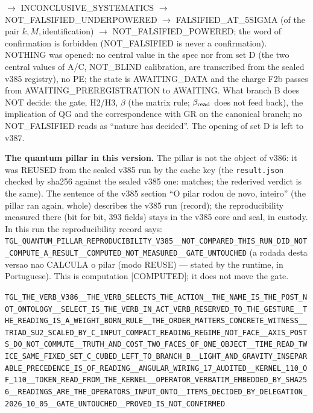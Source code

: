\documentclass[11pt]{article}
\theoremstyle{definition}\newtheorem{deriv}{Derivation}
\begin{document}
$\to$ INCONCLUSIVE\_SYSTEMATICS $\to$ NOT\_FALSIFIED\_UNDERPOWERED $\to$ FALSIFIED\_AT\_5SIGMA (of the pair $k,M,$identification) $\to$ NOT\_FALSIFIED\_POWERED; the word of confirmation is forbidden (NOT\_FALSIFIED is never a confirmation). NOTHING was opened: no central value in the spec nor from set D (the two central values of A/C, NOT\_BLIND calibration, are transcribed from the sealed v385 registry), no PE; the state is AWAITING\_DATA and the charge F2b passes from AWAITING\_PREREGISTRATION to AWAITING. What branch B does NOT decide: the gate, H2/H3, $\beta$ (the matrix rule; $\beta_{\rm read}$ does not feed back), the implication of QG and the correspondence with GR on the canonical branch; no NOT\_FALSIFIED reads as ``nature has decided''. The opening of set D is left to v387.

\textbf{The quantum pillar in this version.} The pillar is not the object of v386: it was REUSED from the sealed v385 run by the cache key (the \texttt{result.json} checked by sha256 against the sealed v385 one: matches; the rederived verdict is the same). The sentence of the v385 section ``O pilar rodou de novo, inteiro'' (the pillar ran again, whole) describes the v385 run (record); the reproducibility measured there (bit for bit, 393 fields) stays in the v385 core and seal, in custody. In this run the reproducibility record says: \texttt{TGL\_QUANTUM\_PILLAR\_REPRODUCIBILITY\_V385\_\_NOT\_COMPARED\_THIS\_RUN\_DID\_NOT\_COMPUTE\_A\_RESULT\_\_COMPUTED\_NOT\_MEASURED\_\_GATE\_UNTOUCHED} (a rodada desta versao nao CALCULA o pilar (modo REUSE) --- stated by the runtime, in Portuguese). This is computation \textsf{[COMPUTED]}; it does not move the gate.

\begin{center}\small\texttt{TGL\_THE\_VERB\_V386\_\_THE\_VERB\_SELECTS\_THE\_ACTION\_\_THE\_NAME\_IS\_THE\_POST\_NOT\_ONTOLOGY\_\_SELECT\_IS\_THE\_VERB\_IN\_ACT\_VERB\_RESERVED\_TO\_THE\_GESTURE\_\_THE\_READING\_IS\_A\_WEIGHT\_BORN\_RULE\_\_THE\_ORDER\_MATTERS\_CONCRETE\_WITNESS\_\_TRIAD\_SU2\_SCALED\_BY\_C\_INPUT\_COMPACT\_READING\_REGIME\_NOT\_FACE\_\_AXIS\_POSTS\_DO\_NOT\_COMMUTE\_\_TRUTH\_AND\_COST\_TWO\_FACES\_OF\_ONE\_OBJECT\_\_TIME\_READ\_TWICE\_SAME\_FIXED\_SET\_C\_CUBED\_LEFT\_TO\_BRANCH\_B\_\_LIGHT\_AND\_GRAVITY\_INSEPARABLE\_PRECEDENCE\_IS\_OF\_READING\_\_ANGULAR\_WIRING\_17\_AUDITED\_\_KERNEL\_110\_OF\_110\_\_TOKEN\_READ\_FROM\_THE\_KERNEL\_\_OPERATOR\_VERBATIM\_EMBEDDED\_BY\_SHA256\_\_READINGS\_ARE\_THE\_OPERATORS\_INPUT\_ONTO\_\_ITEMS\_DECIDED\_BY\_DELEGATION\_2026\_10\_05\_\_GATE\_UNTOUCHED\_\_PROVED\_IS\_NOT\_CONFIRMED}\end{center}
\end{document}
